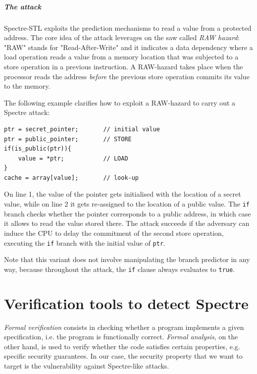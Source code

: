 \documentclass[12pt,a4paper]{book}
\theoremstyle{definition}
\begin{document}
	\paragraph{The attack} Spectre-STL exploits the prediction mechanisms to read a value from a protected address. The core idea of the attack leverages on the saw called \textit{RAW hazard}: "RAW" stands for "Read-After-Write" and it indicates a data dependency where a load operation reads a value from a memory location that was subjected to a store operation in a previous instruction. A RAW-hazard takes place when the processor reads the address \textit{before} the previous store operation commits its value to the memory.
	
	The following example clarifies how to exploit a RAW-hazard to carry out a Spectre attack:
	
	\vspace{3mm}
	\begin{minipage}{.6\textwidth}
	\begin{lstlisting}
ptr = secret_pointer;		// initial value
ptr = public_pointer;		// STORE
if(is_public(ptr)){	
	value = *ptr;			// LOAD
}
cache = array[value];		// look-up
	\end{lstlisting}
	\end{minipage}

	On line 1, the value of the pointer gets initialised with the location of a secret value, while on line 2 it gets re-assigned to the location of a public value. The \texttt{if} branch checks whether the pointer corresponds to a public address, in which case it allows to read the value stored there. The attack succeeds if the adversary can induce the CPU to delay the commitment of the second store operation, executing the \texttt{if} branch with the initial value of \texttt{ptr}.
	
	Note that this variant does not involve manipulating the branch predictor in any way, because throughout the attack, the \texttt{if} clause always evaluates to \texttt{true}.
	
	\chapter{Verification tools to detect Spectre}\label{chapter:verification}
	
	\textit{Formal verification} consists in checking whether a program implements a given specification, i.e. the program is functionally correct. \textit{Formal analysis}, on the other hand, is used to verify whether the code satisfies certain properties, e.g. specific security guarantees. In our case, the security property that we want to target is the vulnerability against Spectre-like attacks. 
	
\end{document}
